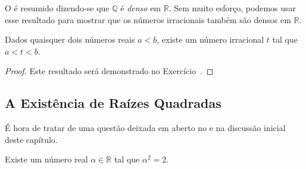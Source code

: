 O  é resumido dizendo-se que $\mathbb{Q}$ é \textit{denso} em $\mathbb{R}$. Sem muito esforço, podemos usar esse resultado para mostrar que os números irracionais também são densos em $\mathbb{R}$. 

 
\begin{corollary}\label{cor:dense-irracionais}
Dados quaisquer dois números reais $a<b$, existe um número irracional $t$ tal que $a<t<b$.
\end{corollary}

\begin{proof}
Este resultado será demonstrado no Exercício~.
\end{proof}

\subsection{A Existência de Raízes Quadradas}\label{subsec:raizes-quadradas}

É hora de tratar de uma questão deixada em aberto no  e na discussão inicial deste capítulo.

 
\begin{theorem}\label{thm:existencia-sqrt2}
Existe um número real $\alpha\in\mathbb{R}$ tal que $\alpha^2=2$.
\end{theorem}


